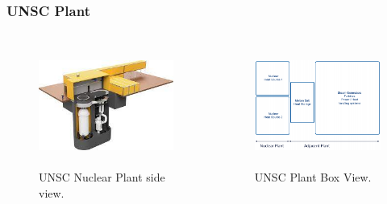 \begin{frame}
        \frametitle{UNSC Plant}
              \begin{columns}
                      \column[t]{5cm}
                      \begin{figure}[htbp!]
                        \begin{center}
                      \includegraphics[height=4cm]{./images/unsc_plant_layout.jpeg}
                    \end{center}
                          \caption{UNSC Nuclear Plant side view. \cite{unsc}}
                    \label{fig:unsc_plant}
                  \end{figure}
                      \column[t]{5cm}
              \begin{figure}[htbp!]
              \begin{center}
            \includegraphics[height=4cm]{./images/unsc_heat_map.png}
          \end{center}
                \caption{UNSC Plant Box View. \cite{unsc_mmr_pres}}
          \label{fig:unsc_heat_map}
        \end{figure}
              \end{columns}
      \end{frame}

